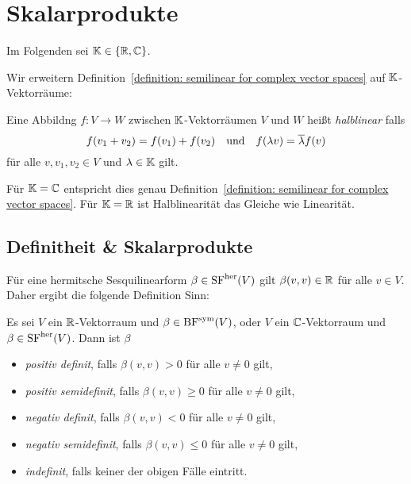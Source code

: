 \chapter{Skalarprodukte}

Im Folgenden sei $\mathbb{K} \in \{ \mathbb{R}, \mathbb{C} \}$.

Wir erweitern Definition~\ref{definition: semilinear for complex vector spaces} auf $\mathbb{K}$-Vektorräume:

\begin{definition}
  Eine Abbildng $f \colon V \to W$ zwischen $\mathbb{K}$-Vektorräumen $V$ und $W$ heißt \emph{halblinear} falls
  \[
    f(v_1 + v_2) = f(v_1) + f(v_2)
    \quad\text{und}\quad
    f(\lambda v) = \overline{\lambda} f(v)
  \]
  für alle $v, v_1, v_2 \in V$ und $\lambda \in \mathbb{K}$ gilt.
\end{definition}

Für $\mathbb{K} = \mathbb{C}$ entspricht dies genau Definition~\ref{definition: semilinear for complex vector spaces}.
Für $\mathbb{K} = \mathbb{R}$ ist Halblinearität das Gleiche wie Linearität.





\section{Definitheit \& Skalarprodukte}

Für eine hermitsche Sesquilinearform $\beta \in \operatorname{SF}^{\operatorname{her}}(V)$ gilt $\beta(v,v) \in \mathbb{R}$ für alle $v \in V$.
Daher ergibt die folgende Definition Sinn:

\begin{definition}
  Es sei $V$ ein $\mathbb{R}$-Vektorraum und $\beta \in \operatorname{BF}^{\operatorname{sym}}(V)$, oder $V$ ein $\mathbb{C}$-Vektorraum und $\beta \in \operatorname{SF}^{\operatorname{her}}(V)$.
  Dann ist $\beta$
  \begin{itemize}
    \item
      \emph{positiv definit}, falls $\beta(v,v) > 0$ für alle $v \neq 0$ gilt,
    \item
      \emph{positiv semidefinit}, falls $\beta(v,v) \geq 0$ für alle $v \neq 0$ gilt,
    \item
      \emph{negativ definit}, falls $\beta(v,v) < 0$ für alle $v \neq 0$ gilt,
    \item
      \emph{negativ semidefinit}, falls $\beta(v,v) \leq 0$ für alle $v \neq 0$ gilt,
    \item
      \emph{indefinit}, falls keiner der obigen Fälle eintritt.
  \end{itemize}
\end{definition}

